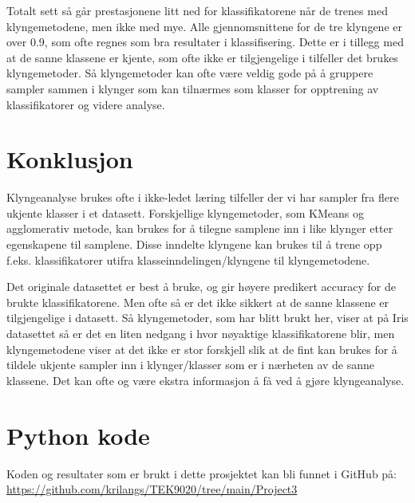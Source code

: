 \documentclass[twocolumn,norwegian]{article}
\begin{document}
	Totalt sett så går prestasjonene litt ned for klassifikatorene når de trenes med klyngemetodene, men ikke med mye. Alle gjennomsnittene for de tre klyngene er over 0.9, som ofte regnes som bra resultater i klassifisering. Dette er i tillegg med at de sanne klassene er kjente, som ofte ikke er tilgjengelige i tilfeller det brukes klyngemetoder. Så klyngemetoder kan ofte være veldig gode på å gruppere sampler sammen i klynger som kan tilnærmes som klasser for opptrening av klassifikatorer og videre analyse.


	\section{Konklusjon}
	Klyngeanalyse brukes ofte i ikke-ledet læring tilfeller der vi har sampler fra flere ukjente klasser i et datasett. Forskjellige klyngemetoder, som KMeans og agglomerativ metode, kan brukes for å tilegne samplene inn i like klynger etter egenskapene til samplene. Disse inndelte klyngene kan brukes til å trene opp f.eks. klassifikatorer utifra klasseinndelingen/klyngene til klyngemetodene.
	
	Det originale datasettet er best å bruke, og gir høyere predikert accuracy for de brukte klassifikatorene. Men ofte så er det ikke sikkert at de sanne klassene er tilgjengelige i datasett. Så klyngemetoder, som har blitt brukt her, viser at på Iris datasettet så er det en liten nedgang i hvor nøyaktige klassifikatorene blir, men klyngemetodene viser at det ikke er stor forskjell slik at de fint kan brukes for å tildele ukjente sampler inn i klynger/klasser som er i nærheten av de sanne klassene. Det kan ofte og være ekstra informasjon å få ved å gjøre klyngeanalyse.
	
	
	\appendix
	\section{Python kode}
	\label{Appendix:Kode}
	Koden og resultater som er brukt i dette prosjektet kan bli funnet i GitHub på: \url{https://github.com/krilangs/TEK9020/tree/main/Project3}
	
\end{document}
